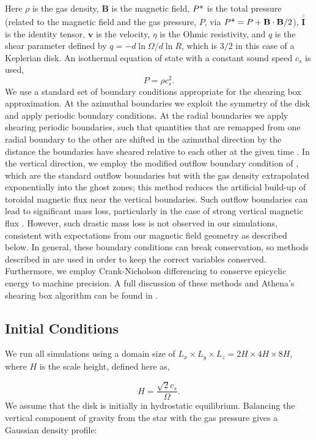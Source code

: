 \noindent Here $\rho$ is the gas density, $\mathbf{B}$ is the magnetic field, $P{\text{*}}$ is the total pressure (related to the magnetic field and the gas pressure, $P$, via $P{\text{*}} = P + {\mathbf{B} \cdot \mathbf{B}}/{2}$), $\mathbf{\bar{\bar{I}}}$ is the identity tensor, $\mathbf{v}$ is the velocity, $\eta$ is the Ohmic resistivity, and $q$ is the shear parameter defined by $q=-d\ln{\Omega}/d\ln{R}$, which is $3/2$ in this case of a Keplerian disk.  An isothermal equation of state with a constant sound speed $c_s$ is used,   
\begin{equation}
P = \rho c_s^2.    
\end{equation}
We use a standard set of boundary conditions appropriate for the shearing box approximation. At the azimuthal boundaries we exploit the symmetry of the disk and apply periodic boundary conditions. At the radial boundaries we  apply shearing periodic boundaries, such that quantities that are remapped from one radial boundary to the other are  shifted in the azimuthal direction by the distance the boundaries have sheared relative to each other at the given time \citep{hawley95}. In the vertical direction, we employ the modified outflow boundary condition of \cite{simon13}, which are the standard outflow boundaries but with the gas density extrapolated exponentially into the ghost zones; this method reduces the artificial build-up of toroidal magnetic flux near the vertical boundaries.  Such outflow boundaries can lead to significant mass loss, particularly in the case of strong vertical magnetic flux \citep{simon13}.  However, such drastic mass loss is not observed in our simulations, consistent with expectations from our magnetic field geometry as described below. In general, these boundary conditions can break conservation, so methods described in \cite{stone10} are used in order to keep the correct variables conserved.   Furthermore, we employ Crank-Nicholson differencing to conserve epicyclic energy to machine precision. A full discussion of these methods and {\sc Athena}'s shearing box algorithm can be found in \cite{stone10}.\\      


\subsection{Initial Conditions}
We run all simulations using a domain size of $L_x \times L_y \times L_z = 2H \times 4H \times 8H$, where $H$ is the scale height, defined here as,

\begin{equation}
H = \frac{\sqrt{2} c_s}{\Omega}.     
\label{eq_H_definition}    
\end{equation}
We assume that the disk is initially in hydrostatic equilibrium.  Balancing the vertical component of gravity from the star with the gas pressure gives a Gaussian density profile:


